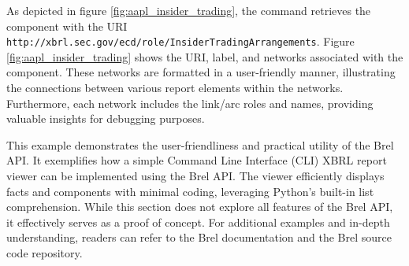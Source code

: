 As depicted in figure \ref{fig:aapl_insider_trading},  
the command retrieves the component with the URI \texttt{http://xbrl.sec.gov/ecd/role/InsiderTradingArrangements}.  
Figure \ref{fig:aapl_insider_trading} shows the URI, label, and networks associated with the component.  
These networks are formatted in a user-friendly manner,  
illustrating the connections between various report elements within the networks.  
Furthermore, each network includes the link/arc roles and names, providing valuable insights for debugging purposes.

This example demonstrates the user-friendliness and practical utility of the Brel API.  
It exemplifies how a simple Command Line Interface (CLI) XBRL report viewer can be implemented using the Brel API.  
The viewer efficiently displays facts and components with minimal coding, leveraging Python's built-in list comprehension.  
While this section does not explore all features of the Brel API, it effectively serves as a proof of concept.  
For additional examples and in-depth understanding, readers can refer to the Brel documentation\cite{brel_api} and the Brel source code repository\cite{brel_source}.

